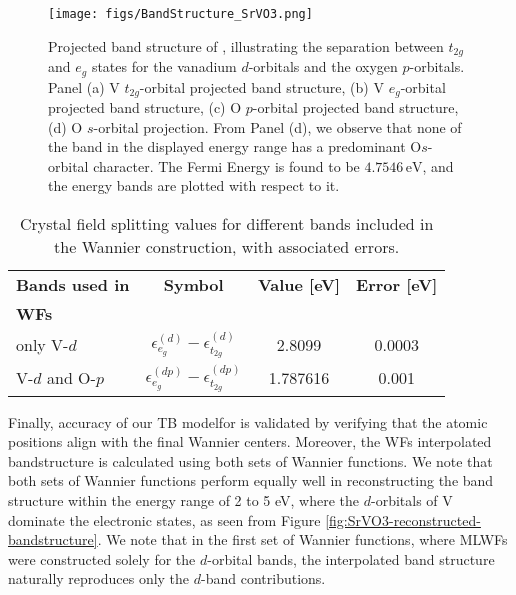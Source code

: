 \documentclass[%
 reprint,
 amsmath,amssymb,
 aps,
]{revtex4-2}
\begin{document}
\begin{figure}[H]
    \centering
    \texttt{[image: figs/BandStructure\_SrVO3.png]}
    \caption{
Projected band structure of , illustrating the separation between \(t_{2g}\) and \(e_g\) states for the vanadium \(d\)-orbitals and the oxygen \(p\)-orbitals. Panel (a) V \(t_{2g}\)-orbital projected band structure, (b) V \(e_g\)-orbital projected band structure, (c) O \(p\)-orbital projected band structure, (d) O \(s\)-orbital projection. From Panel (d), we observe that none of the band in the displayed energy range has a predominant O\(s\)-orbital character. The Fermi Energy is found to be \(4.7546 \, \text{eV}\), and the energy bands are plotted with respect to it. }
\label{fig:SrVO3-bandstructure}
\end{figure}
\begin{table}[H]
\centering
\caption{Crystal field splitting values for different bands included in the Wannier construction, with associated errors.}
\begin{tabular}{|l|c|c|c|}
\hline
\textbf{Bands used in} & \textbf{Symbol} & \textbf{Value [eV]} & \textbf{Error [eV]} \\ 
\textbf{WFs} & & & \\ \hline
only V-\(d\) & $\epsilon_{e_g}^{(d)} - \epsilon_{t_{2g}}^{(d)}$ & 2.8099 & 0.0003\\ \hline
V-\(d\) and O-\(p\) & $\epsilon_{e_g}^{(dp)} - \epsilon_{t_{2g}}^{(dp)}$ & 1.787616 & 0.001 \\ \hline
\end{tabular}
\label{table:splitting-SrVO3}
\end{table}
Finally, accuracy of our TB modelfor  is validated by verifying that the atomic positions align with the final Wannier centers. Moreover, the WFs interpolated bandstructure is calculated using both sets of Wannier functions. We note that both sets of Wannier functions perform equally well in reconstructing the band structure within the energy range of 2 to 5 eV, where the \(d\)-orbitals of V dominate the electronic states, as seen from Figure \ref{fig:SrVO3-reconstructed-bandstructure}.
We note that in the first set of Wannier functions, where MLWFs were constructed solely for the \(d\)-orbital bands, the interpolated band structure naturally reproduces only the \(d\)-band contributions. 
\end{document}
